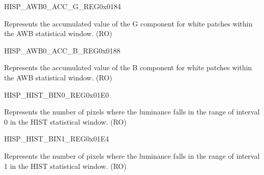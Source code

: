 \begin{register}{H}{ISP\_AWB0\_ACC\_G\_REG}{0x0184}\label{regdesc:ISPAWB0ACCGREG}
%
\regnewline%
\begin{regdesc}\begin{reglist}
\label{fielddesc:ISPAWB0ACCG}\item [ISP\_AWB0\_ACC\_G] Represents the accumulated value of the G component for white patches within the AWB statistical window. (RO)
\end{reglist}\end{regdesc}
\end{register}


\begin{register}{H}{ISP\_AWB0\_ACC\_B\_REG}{0x0188}\label{regdesc:ISPAWB0ACCBREG}
%
\regnewline%
\begin{regdesc}\begin{reglist}
\label{fielddesc:ISPAWB0ACCB}\item [ISP\_AWB0\_ACC\_B] Represents the accumulated value of the B component for white patches within the AWB statistical window. (RO)
\end{reglist}\end{regdesc}
\end{register}




\begin{register}{H}{ISP\_HIST\_BIN0\_REG}{0x01E0}\label{regdesc:ISPHISTBIN0REG}
%
%
\regnewline%
\begin{regdesc}\begin{reglist}
\label{fielddesc:ISPHISTBIN0}\item [ISP\_HIST\_BIN\_0] Represents the number of pixels where the luminance falls in the range of interval 0 in the HIST statistical window. (RO)
\end{reglist}\end{regdesc}
\end{register}


\begin{register}{H}{ISP\_HIST\_BIN1\_REG}{0x01E4}\label{regdesc:ISPHISTBIN1REG}
%
%
\regnewline%
\begin{regdesc}\begin{reglist}
\label{fielddesc:ISPHISTBIN1}\item [ISP\_HIST\_BIN\_1] Represents the number of pixels where the luminance falls in the range of interval 1 in the HIST statistical window. (RO)
\end{reglist}\end{regdesc}
\end{register}


